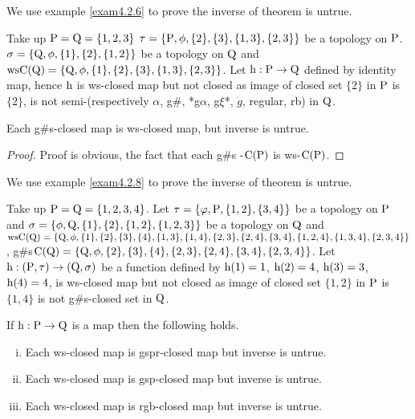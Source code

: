 We use example \ref{exam4.2.6} to prove the inverse of theorem is untrue.

\begin{exm}\label{exam4.2.6}
Take up $\mathrm{P} = \mathrm{Q} = \{1, 2, 3\}$ $\tau = \{\mathrm{P}, \phi, \{2\}, \{3\},\{1,3\},\{2, 3\}\}$ be a topology on $\mathrm{P}$. $\sigma =\{\mathrm{Q}, \phi, \{1\}, \{2\}, \{1, 2\}\}$ be a topology on $\mathrm{Q}$ and $\mathrm{ws}\mathrm{C}(\mathrm{Q})=\{\mathrm{Q}, \phi,\{1\},\{2\},\{3\},\{1,3\},\{2,3\}\}$. Let $\mathrm{h}: \mathrm{P} \to \mathrm{Q}$ defined by identity map, hence $\mathrm{h}$ is ws-closed map but not closed as image of closed set $\{2\}$ in $\mathrm{P}$ is $\{2\}$, is not semi-(respectively $\alpha$, g\#, *g$\alpha$, g$\xi$*, $\ddot{g}$, regular, rb) in $\mathrm{Q}$.
\end{exm}

\begin{thm}\label{thm4.2.7}
Each g\#s-closed map is ws-closed map, but inverse is untrue.
\end{thm}

\begin{proof}
Proof is obvious, the fact that each g\#s -$\mathrm{C}(\mathrm{P})$ is ws-$\mathrm{C}(\mathrm{P})$.
\end{proof}

We use example \ref{exam4.2.8} to prove the inverse of theorem is untrue.

\begin{exm}\label{exam4.2.8}
Take up $\mathrm{P}=\mathrm{Q}= \{1, 2, 3, 4\}$. Let $\tau= \{\varphi, \mathrm{P}, \{1,2\}, \{3,4\}\}$ be a topology on $\mathrm{P}$ and $\sigma=\{\phi, \mathrm{Q}, \{1\}, \{2\}, \{1, 2\},\{1,2,3\}\}$ be a topology on $\mathrm{Q}$ and $\ws\TSC(\TSQ)=\{\TSQ, \phi, \{1\},\{2\},\{3\},\{4\},\{1,3\}, \{1,4\},\{2,3\},\{2,4\},\{3,4\},\{1,2,4\}, \{1,3,4\},\break \{2,3,4\}\}$, g\#s$\mathrm{C}(\mathrm{Q})=\{\mathrm{Q}, \phi, \{2\},\{3\},\{4\},\{2,3\},\{2,4\},\{3,4\},\{2,3,4\}\}$. Let $\TSh: (\TSP, \tau )\break \to (\TSQ, \sigma)$ be a function defined by $\mathrm{h}(1)= 1$, $\mathrm{h}(2)=4$, $\mathrm{h}(3)=3$, $\mathrm{h}(4)=4$, is ws-closed map but not closed as image of closed set $\{1,2\}$ in $\mathrm{P}$ is $\{1,4\}$ is not g\#s-closed set in $\mathrm{Q}$.
\end{exm}

\begin{thm}\label{thm4.2.9}
If $\mathrm{h}: \mathrm{P}\to \mathrm{Q}$ is a map then the following holds.
\begin{enumerate}[(i)]
\item Each ws-closed map is gspr-closed map but inverse is untrue.
\item Each ws-closed map is gsp-closed map but inverse is untrue.
\item Each ws-closed map is rgb-closed map but inverse is untrue.
\end{enumerate}
\end{thm}

